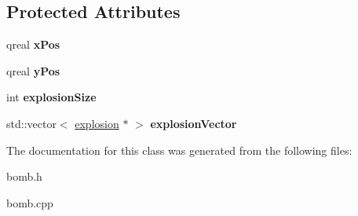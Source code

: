 \subsection*{Protected Attributes}
\begin{DoxyCompactItemize}
\item 
\hypertarget{class_bomb_ac2068167b771ed338aa17c99524b8131}{qreal {\bfseries x\-Pos}}\label{class_bomb_ac2068167b771ed338aa17c99524b8131}

\item 
\hypertarget{class_bomb_a0d1028a49b33b08f5c96a943fab0beff}{qreal {\bfseries y\-Pos}}\label{class_bomb_a0d1028a49b33b08f5c96a943fab0beff}

\item 
\hypertarget{class_bomb_a7576bf99d4bcfbc7dda365511ca2fcd7}{int {\bfseries explosion\-Size}}\label{class_bomb_a7576bf99d4bcfbc7dda365511ca2fcd7}

\item 
\hypertarget{class_bomb_a03d27f3d615aba4b77f83427912a7de6}{std\-::vector$<$ \hyperlink{classexplosion}{explosion} $\ast$ $>$ {\bfseries explosion\-Vector}}\label{class_bomb_a03d27f3d615aba4b77f83427912a7de6}

\end{DoxyCompactItemize}


The documentation for this class was generated from the following files\-:\begin{DoxyCompactItemize}
\item 
bomb.\-h\item 
bomb.\-cpp\end{DoxyCompactItemize}
